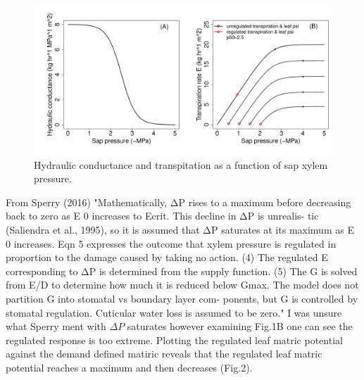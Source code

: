 \documentclass[a4paper]{article}\usepackage[]{graphicx}\usepackage[]{color}
\makeatletter
\def\maxwidth{ %
  \ifdim\Gin@nat@width>\linewidth
    \linewidth
  \else
    \Gin@nat@width
  \fi
}
\newenvironment{kframe}{%
 \def\at@end@of@kframe{}%
 \ifinner\ifhmode%
  \def\at@end@of@kframe{\end{minipage}}%
  \begin{minipage}{\columnwidth}%
 \fi\fi%
 \def\FrameCommand##1{\hskip\@totalleftmargin \hskip-\fboxsep
 \colorbox{shadecolor}{##1}\hskip-\fboxsep
     \hskip-\linewidth \hskip-\@totalleftmargin \hskip\columnwidth}%
 \MakeFramed {\advance\hsize-\width
   \@totalleftmargin\z@ \linewidth\hsize
   \@setminipage}}%
 {\par\unskip\endMakeFramed%
 \at@end@of@kframe}
\newenvironment{knitrout}{}{} %
\makeatother
\begin{document}
\begin{centering}
\begin{knitrout}
\color{fgcolor}\begin{figure}
\includegraphics[width=\maxwidth]{figure/unnamed-chunk-10-1} \caption{\label{fig:figs}Hydraulic conductance and transpitation as a function of sap xylem pressure.}\label{fig:unnamed-chunk-10}
\end{figure}


\end{knitrout}
\end{centering}

From Sperry (2016) "Mathematically, ΔP rises to a maximum before decreasing back to zero as E 0 increases to Ecrit. This decline in ΔP is unrealis- tic (Saliendra et al., 1995), so it is assumed that ΔP saturates at its maximum as E 0 increases. Eqn 5 expresses the outcome that xylem pressure is regulated in proportion to the damage caused by taking no action. (4) The regulated E corresponding to ΔP is determined from the supply function. (5) The G is solved from E/D to determine how much it is reduced below Gmax. The model does not partition G into stomatal vs boundary layer com- ponents, but G is controlled by stomatal regulation. Cuticular water loss is assumed to be zero." I was unsure what Sperry ment with $\Delta P$ saturates however examining Fig.1B one can see the regulated response is too extreme. Plotting the regulated leaf matric potential against the demand defined matiric reveals that the regulated leaf matric potential reaches a maximum and then decreases (Fig.2). 

\begin{centering}
\begin{knitrout}
\color{fgcolor}\begin{kframe}


{\ttfamily\noindent\bfseries\color{errorcolor}{\#\# Error in regulated\_leaf\_psi[, 1]: incorrect number of dimensions}}

{\ttfamily\noindent\bfseries{}}\end{kframe}
\end{knitrout}
\end{centering}
\end{document}
